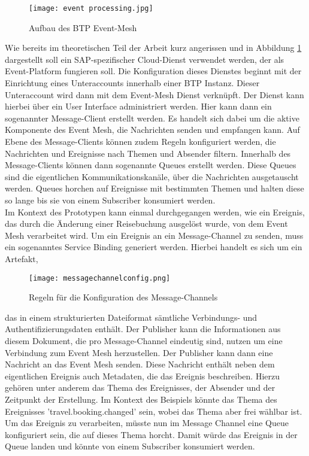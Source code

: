   \begin{figure}[H]
    \centering
    \texttt{[image: event processing.jpg]}
    \caption[BTP Event-Mesh]{Aufbau des BTP Event-Mesh \footnotemark}
    \label{EMprocessing}
  \end{figure}
  Wie bereits im theoretischen Teil der Arbeit kurz angerissen und in Abbildung \ref{EMprocessing} dargestellt soll ein SAP-spezifischer Cloud-Dienst verwendet werden, der als Event-Platform fungieren soll. Die Konfiguration dieses Dienstes beginnt mit der Einrichtung eines Unteraccounts innerhalb einer \ac{BTP} Instanz. Dieser Unteraccount wird dann mit dem Event-Mesh Dienst verknüpft. Der Dienst kann hierbei über ein User Interface administriert werden. Hier kann dann ein sogenannter Message-Client erstellt werden. Es handelt sich dabei um die aktive Komponente des Event Mesh, die Nachrichten senden und empfangen kann. Auf Ebene des Message-Clients können zudem Regeln konfiguriert werden, die Nachrichten und Ereignisse nach Themen und Absender filtern. Innerhalb des Message-Clients können dann sogenannte Queues erstellt werden. Diese Queues sind die eigentlichen Kommunikationskanäle, über die Nachrichten ausgetauscht werden. Queues horchen auf Ereignisse mit bestimmten Themen und halten diese so lange bis sie von einem Subscriber konsumiert werden.\\ Im Kontext des Prototypen kann einmal durchgegangen werden, wie ein Ereignis, das durch die Änderung einer Reisebuchung ausgelöst wurde, von dem Event Mesh verarbeitet wird. Um ein Ereignis an ein Message-Channel zu senden, muss ein sogenanntes Service Binding generiert werden. Hierbei handelt es sich um ein Artefakt, 
   \begin{wrapfigure}{l}{7cm}
   \centering
   \texttt{[image: messagechannelconfig.png]}
   \caption[Message-Channel Konfiguration]{Regeln für die Konfiguration des Message-Channels \footnotemark}
   \label{MesChannelConfig}
 \end{wrapfigure}
  das in einem strukturierten Dateiformat sämtliche Verbindungs- und Authentifizierungsdaten enthält. Der Publisher kann die Informationen aus diesem Dokument, die pro Message-Channel eindeutig sind, nutzen um eine Verbindung zum Event Mesh herzustellen. Der Publisher kann dann eine Nachricht an das Event Mesh senden. Diese Nachricht enthält neben dem eigentlichen Ereignis auch Metadaten, die das Ereignis beschreiben.  
  Hierzu gehören unter anderem das Thema des Ereignisses, der Absender und der Zeitpunkt der Erstellung. Im Kontext des Beispiels könnte das Thema des Ereignisses 'travel.booking.changed' sein, wobei das Thema aber frei wählbar ist. Um das Ereignis zu verarbeiten, müsste nun im Message Channel eine Queue konfiguriert sein, die auf dieses Thema horcht. Damit würde das Ereignis in der Queue landen und könnte von einem Subscriber konsumiert werden. 
